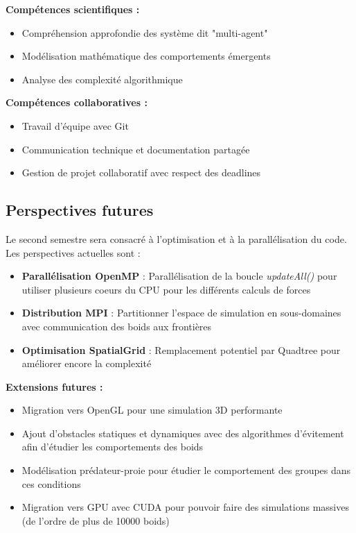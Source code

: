 \documentclass[11pt,a4paper]{article}
\begin{document}
\textbf{Compétences scientifiques :}
\begin{itemize}
    \item Compréhension approfondie des système dit "multi-agent"
    \item Modélisation mathématique des comportements émergents
    \item Analyse des complexité algorithmique
\end{itemize}

\textbf{Compétences collaboratives :}
\begin{itemize}
    \item Travail d'équipe avec Git
    \item Communication technique et documentation partagée
    \item Gestion de projet collaboratif avec respect des deadlines
\end{itemize}

\subsection{Perspectives futures}

Le second semestre sera consacré à l'optimisation et à la parallélisation du code. Les perspectives actuelles sont :
\begin{itemize}
    \item \textbf{Parallélisation OpenMP} : Parallélisation de la boucle \textit{updateAll()} pour utiliser plusieurs coeurs du CPU pour les différents calculs de forces 
    \item \textbf{Distribution MPI} : Partitionner l'espace de simulation en sous-domaines avec communication des boids aux frontières
    \item \textbf{Optimisation SpatialGrid} : Remplacement potentiel par Quadtree pour  améliorer encore la complexité 
\end{itemize}

\textbf{Extensions futures :}
\begin{itemize}
    \item Migration vers OpenGL pour une simulation 3D performante
    \item Ajout d'obstacles statiques et dynamiques avec des algorithmes d'évitement afin d'étudier les comportements des boids 
    \item Modélisation prédateur-proie pour étudier le comportement des groupes dans ces conditions
    \item Migration vers GPU avec CUDA pour pouvoir faire des simulations massives (de l'ordre de plus de 10000 boids)
\end{itemize}
\end{document}
